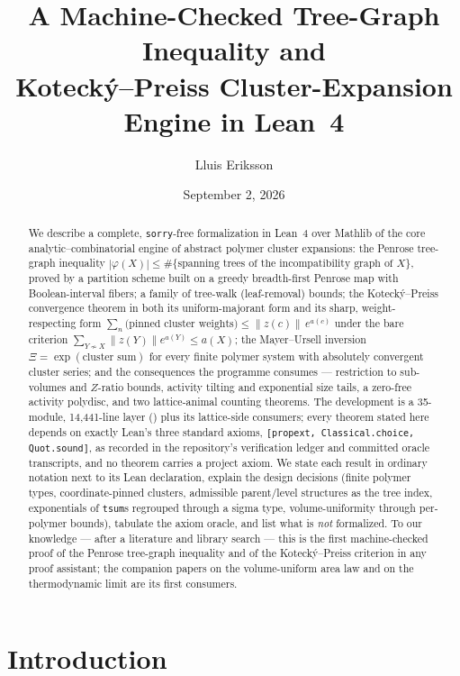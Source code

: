 \documentclass[11pt]{article}
\title{A Machine-Checked Tree-Graph Inequality and\\
Koteck\'y--Preiss Cluster-Expansion Engine in Lean~4}
\author{Lluis Eriksson}
\date{September 2, 2026}
\theoremstyle{definition}
\theoremstyle{remark}
\newcommand{\file}[1]{{\normalfont\path{#1}}}
\newcommand{\incomp}{\not\sim}
\newcommand{\Ur}{\varphi}
\newcommand{\oracle}{\texttt{[propext, Classical.choice, Quot.sound]}}
\begin{document}
\maketitle

\begin{abstract}
We describe a complete, \texttt{sorry}-free formalization in Lean~4 over
Mathlib of the core analytic--combinatorial engine of abstract polymer
cluster expansions: the Penrose tree-graph inequality
$|\Ur(X)| \le \#\{\text{spanning trees of the incompatibility graph of }X\}$,
proved by a partition scheme built on a greedy breadth-first Penrose map with
Boolean-interval fibers; a family of tree-walk (leaf-removal) bounds; the
Koteck\'y--Preiss convergence theorem in both its uniform-majorant form and its
sharp, weight-respecting form
$\sum_n \bigl(\text{pinned cluster weights}\bigr) \le \|z(c)\|\,e^{a(c)}$ under
the bare criterion $\sum_{Y \incomp X}\|z(Y)\|e^{a(Y)} \le a(X)$; the
Mayer--Ursell inversion $\Xi = \exp(\text{cluster sum})$ for every finite polymer
system with absolutely convergent cluster series; and the consequences the
programme consumes --- restriction to sub-volumes and $Z$-ratio bounds,
activity tilting and exponential size tails, a zero-free activity polydisc,
and two lattice-animal counting theorems.  The development is a 35-module,
14{,}441-line layer (\file{YangMills/KP/}) plus its lattice-side consumers;
every theorem stated here depends on exactly Lean's three standard axioms,
\oracle{}, as recorded in the repository's verification ledger and committed
oracle transcripts, and no theorem carries a project axiom.  We state each
result in ordinary notation next to its Lean declaration, explain the design
decisions (finite polymer types, coordinate-pinned clusters, admissible
parent/level structures as the tree index, exponentials of \texttt{tsum}s
regrouped through a sigma type, volume-uniformity through per-polymer
bounds), tabulate the axiom oracle, and list what is \emph{not} formalized.
To our knowledge --- after a literature and library search --- this is the
first machine-checked proof of the Penrose tree-graph inequality and of the
Koteck\'y--Preiss criterion in any proof assistant; the companion papers on
the volume-uniform area law and on the thermodynamic limit are its first
consumers.
\end{abstract}

\section{Introduction}\label{sec:intro}
\end{document}
